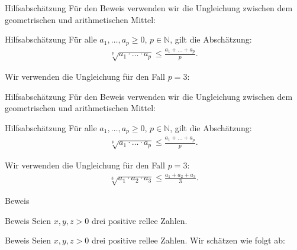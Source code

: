 \documentclass[10pt]{beamer}
\def\bN{\mathbb{N}}
\begin{document}
\begin{frame}{Hilfsabschätzung}
    Für den Beweis verwenden wir die Ungleichung zwischen dem geometrischen und arithmetischen Mittel:
    \begin{block}{Hilfsabschätzung}
        Für alle \( a_{1}, \ldots, a_{p} \geq 0 \), \( p \in \bN \), gilt die Abschätzung:
        \begin{align*}
            \sqrt[p]{a_{1} \cdot \ldots \cdot a_{p}} 
            \leq \frac{a_{1} + \ldots + a_{p}}{p}.
        \end{align*}
    \end{block}
    Wir verwenden die Ungleichung für den Fall \( p = 3 \):
\end{frame}



\begin{frame}{Hilfsabschätzung}
    Für den Beweis verwenden wir die Ungleichung zwischen dem geometrischen und arithmetischen Mittel:
    \begin{block}{Hilfsabschätzung}
        Für alle \( a_{1}, \ldots, a_{p} \geq 0 \), \( p \in \bN \), gilt die Abschätzung:
        \begin{align*}
            \sqrt[p]{a_{1} \cdot \ldots \cdot a_{p}} 
            \leq \frac{a_{1} + \ldots + a_{p}}{p}.
        \end{align*}
    \end{block}
    Wir verwenden die Ungleichung für den Fall \( p = 3 \):
    \begin{align*}
        \sqrt[3]{a_{1} \cdot a_{2} \cdot a_{3}} 
        \leq \frac{a_{1} + a_{2} + a_{3}}{3}.
    \end{align*}
\end{frame}



\begin{frame}{Beweis}
    
\end{frame}



\begin{frame}{Beweis}
    Seien \( x, y, z > 0 \) drei positive rellee Zahlen.
\end{frame}



\begin{frame}{Beweis}
    Seien \( x, y, z > 0 \) drei positive rellee Zahlen. Wir schätzen wie folgt ab:
\end{frame}
\end{document}
